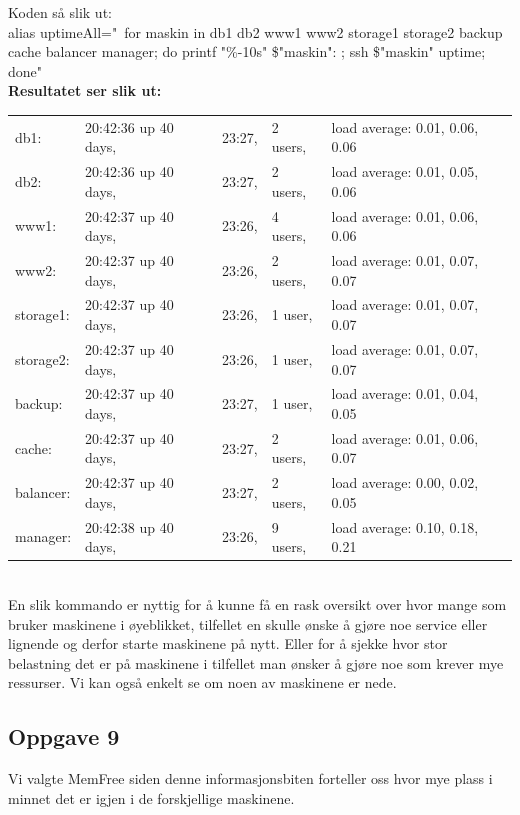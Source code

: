 \documentclass[a4paper, norsk, 12pt]{article}
\begin{document}
Koden så slik ut:\\
alias uptimeAll="\ for maskin in db1 db2 www1 www2 storage1 storage2 backup cache balancer manager; do printf "\%-10s" \$"maskin": ;  ssh \$"maskin" uptime; done"\\

\textbf{Resultatet ser slik ut:}\\
\begin{tabular}{lllll}
db1: & 20:42:36 up 40 days, & 23:27, & 2 users, & load average: 0.01, 0.06, 0.06\\
db2: & 20:42:36 up 40 days, & 23:27, & 2 users, & load average: 0.01, 0.05, 0.06\\
www1: & 20:42:37 up 40 days, & 23:26, & 4 users,& load average: 0.01, 0.06, 0.06\\
www2: & 20:42:37 up 40 days, & 23:26, & 2 users,& load average: 0.01, 0.07, 0.07\\
storage1: & 20:42:37 up 40 days, & 23:26, & 1 user, & load average: 0.01, 0.07, 0.07\\
storage2: & 20:42:37 up 40 days, & 23:26, & 1 user, & load average: 0.01, 0.07, 0.07\\
backup: & 20:42:37 up 40 days, & 23:27, & 1 user, & load average: 0.01, 0.04, 0.05\\
cache: & 20:42:37 up 40 days, & 23:27, & 2 users, & load average: 0.01, 0.06, 0.07\\
balancer: & 20:42:37 up 40 days, & 23:27, & 2 users, & load average: 0.00, 0.02, 0.05\\
manager: & 20:42:38 up 40 days, & 23:26, & 9 users, & load average: 0.10, 0.18, 0.21
\end{tabular}
\\

En slik kommando er nyttig for å kunne få en rask oversikt over hvor mange som bruker maskinene i øyeblikket, tilfellet en skulle ønske å gjøre noe service eller lignende og derfor starte maskinene på nytt. Eller for å sjekke hvor stor belastning det er på maskinene i tilfellet man ønsker å gjøre noe som krever mye ressurser. Vi kan også enkelt se om noen av maskinene er nede.

\subsection*{Oppgave 9}
Vi valgte MemFree siden denne informasjonsbiten forteller oss hvor mye plass i minnet det er igjen i de forskjellige maskinene. \\
\end{document}
